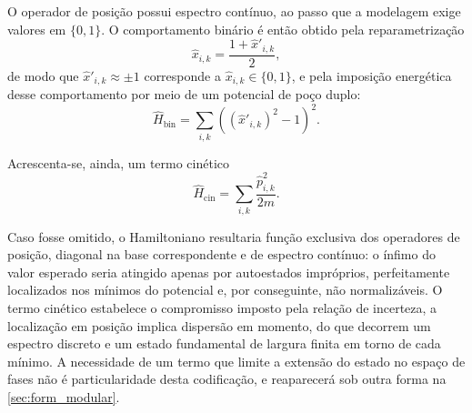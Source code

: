         O operador de posição possui espectro contínuo, ao passo que a modelagem exige valores em $\{0, 1\}$. O comportamento binário é então obtido pela reparametrização \cite{arrazola2019machine}
        \begin{equation}\label{eq:form_qubo_reparam}
            \hat{x}_{i,k} = \frac{1 + \hat{x}'_{i,k}}{2} ,
        \end{equation}
        \noindent de modo que $\hat{x}'_{i,k} \approx \pm 1$ corresponde a $\hat{x}_{i,k} \in \{0, 1\}$, e pela imposição energética desse comportamento por meio de um potencial de poço duplo:
        \begin{equation}\label{eq:form_qubo_bin}
            \hat{H}_{\text{bin}} = \sum_{i,k} \left( (\hat{x}'_{i,k})^2 - 1 \right)^2 .
        \end{equation}

        Acrescenta-se, ainda, um termo cinético \cite{verdon2019quantum}
        \begin{equation}\label{eq:form_qubo_cin}
            \hat{H}_{\text{cin}} = \sum_{i,k} \frac{\hat{p}_{i,k}^2}{2m} .
        \end{equation}

        Caso fosse omitido, o Hamiltoniano resultaria função exclusiva dos operadores de posição, diagonal na base correspondente e de espectro contínuo: o ínfimo do valor esperado seria atingido apenas por autoestados impróprios, perfeitamente localizados nos mínimos do potencial e, por conseguinte, não normalizáveis. O termo cinético estabelece o compromisso imposto pela relação de incerteza, a localização em posição implica dispersão em momento, do que decorrem um espectro discreto e um estado fundamental de largura finita em torno de cada mínimo. A necessidade de um termo que limite a extensão do estado no espaço de fases não é particularidade desta codificação, e reaparecerá sob outra forma na \autoref{sec:form_modular}.

